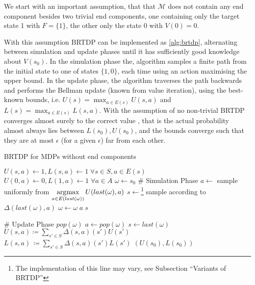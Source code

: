 We start with an important assumption, that
that $\mathcal{M}$ does not contain any end component
besides two trivial end components, one containing only the target state
1 with $F = \{1\}$, the other only the state 0 with $V(0) = 0$.

With this assumption BRTDP can be implemented as \autoref{alg:brtdp},
alternating between simulation and update phases until it has
sufficiently good knowledge about $V(s_0)$. In the simulation phase the,
algorithm samples a finite path from the initial state to one of states
$\{1, 0\}$, each time using an action maximising the upper bound.
In the update phase, the algorithm traverses the path backwards and
performs the Bellman update (known from value iteration),
using the best-known bounds, i.e.
$U(s) = \max_{a \in E(s)} U(s, a)$
and
$L(s) = \max_{a \in E(s)} L(s, a)$.
With the assumption of no non-trivial BRTDP converges almost surely to the correct value \parencite{atva14},
that is
the actual probability almost always lies between $L(s_0), U(s_0)$,
and the bounds converge such that they are at most $\epsilon$ (for a
given $\epsilon$) far from each other.


\begin{algorithm}
\caption{BRTDP for MDPs without end components}
\label{alg:brtdp}
\begin{algorithmic}[1]
\State $U(s,a) \gets 1, L(s,a) \gets 1 \; \forall s \in S, a \in E(s)$
\State $U(0,a) \gets 0, L(1,a) \gets 1 \; \forall a \in A$
\State $\omega \gets s_0$
    \State \# Simulation Phase
        \State $a \gets$ sample uniformly from
           $\operatorname*{\arg\!\max}\limits_{a \in E(last(\omega))}
            U(last(\omega), a)$
        \State $s \gets$\footnote{The implementation of this line may
            vary, see Subsection ``Variants of BRTDP''}
            sample according to $\Delta(last(\omega), a)$
        \State $\omega \gets \omega \; a \; s$
    \EndWhile

    \State \# Update Phase
        \State $pop(\omega)$
        \State $a \gets pop(\omega)$
        \State $s \gets last(\omega)$
        \State $U(s,a) \coloneqq \sum_{s' \in S} \Delta(s,a)(s') U(s')$
        \State $L(s,a)\, \coloneqq \sum_{s' \in S} \Delta(s,a)(s') L(s')$
    \EndWhile
\EndWhile
\State \Return $(U(s_0), L(s_0))$
\end{algorithmic}
\end{algorithm}

